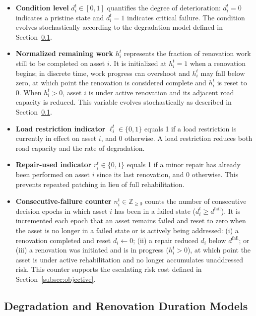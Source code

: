\documentclass[3p, twocolumn]{elsarticle}
\begin{document}
\begin{itemize}
    \item \textbf{Condition level} $d_i^t \in [0, 1]$ quantifies the degree of deterioration: $d_i^t = 0$ indicates a pristine state and $d_i^t = 1$ indicates critical failure. The condition evolves stochastically according to the degradation model defined in Section~\ref{subsec:degradation}.

    \item \textbf{Normalized remaining work} $h_i^t$ represents the fraction of renovation work still to be completed on asset $i$. It is initialized at $h_i^t = 1$ when a renovation begins; in discrete time, work progress can overshoot and $h_i^t$ may fall below zero, at which point the renovation is considered complete and $h_i^t$ is reset to 0. When $h_i^t > 0$, asset $i$ is under active renovation and its adjacent road capacity is reduced. This variable evolves stochastically as described in Section~\ref{subsec:degradation}.

    \item \textbf{Load restriction indicator} $\ell_i^t \in \{0, 1\}$ equals 1 if a load restriction is currently in effect on asset $i$, and 0 otherwise. A load restriction reduces both road capacity and the rate of degradation.

    \item \textbf{Repair-used indicator} $r_i^t \in \{0, 1\}$ equals 1 if a minor repair has already been performed on asset $i$ since its last renovation, and 0 otherwise. This prevents repeated patching in lieu of full rehabilitation.

    \item \textbf{Consecutive-failure counter} $n_i^t \in \mathbb{Z}_{\geq 0}$ counts the number of consecutive decision epochs in which asset $i$ has been in a failed state ($d_i^t \geq d^{\text{fail}}$). It is incremented each epoch that an asset remains failed and reset to zero when the asset is no longer in a failed state or is actively being addressed: (i) a renovation completed and reset $d_i \leftarrow 0$; (ii) a repair reduced $d_i$ below $d^{\text{fail}}$; or (iii) a renovation was initiated and is in progress ($h_i^t > 0$), at which point the asset is under active rehabilitation and no longer accumulates unaddressed risk. This counter supports the escalating risk cost defined in Section~\ref{subsec:objective}.
\end{itemize}

\subsection{Degradation and Renovation Duration Models}
\label{subsec:degradation}
\end{document}
